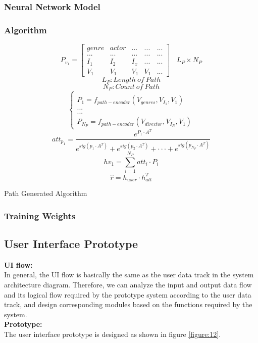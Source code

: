\subsubsection{Neural Network Model}
\subsubsection{Algorithm}

\begin{algorithm}[H]
\SetAlgoLined
\KwResult{ \[ P_{v_{1}} \] \[ \hat{r} \] }

\[
P_{v_{1}} = \begin{bmatrix}
 genre & actor  & ... & ... & ... \\ 
 ... & ...  & ... & ... & ... \\ 
 I_{1}& I_{2} & I_{x} & ... & ... \\ 
 V_{1} & V_{1}  & V_{1}  & V_{1} & ...
\end{bmatrix}
\ \ \ \ L_{P}\times N_{P}
\]
\[
L_{P} : Length \ of \ Path
\]
\[
N_{P} : Count \ of \ Path
\]
\[
\left\{\begin{matrix}
\\ P_{1} = f_{path-encoder} (V_{genres},V_{I_{1}},V_{1})
\\ ...
\\ ...
\\ P_{N_{P}} = f_{path-encoder} (V_{director},V_{I_{N}},V_{1})

\end{matrix}\right.
\]
\[
att_{p_{1}} = \frac{e^{P_{1} \cdot A^{T}}}{e^{sig(p_{1}\cdot A^{T})}  +  e^{sig(p_{2}\cdot A^{T})}  + \cdot \cdot \cdot +e^{sig(p_{N_{P}}\cdot A^{T})}}
\]
\[
hv_{1} =  \sum_{i=1}^{N_{P}} att_{i}\cdot P_{i}
\]
\[
\hat{r} = h_{user}\cdot h_{att}^{T}
\]
 
\caption{Path Generated Algorithm}
\end{algorithm}

\subsubsection{Training Weights}


\subsection{User Interface Prototype} 

\textbf{UI flow:}\\
In general, the UI flow is basically the same as the user data track in the system architecture diagram. Therefore, we can analyze the input and output data flow and its logical flow required by the prototype system according to the user data track, and design corresponding modules based on the functions required by the system.\\
\textbf{Prototype:}\\
The user interface prototype is designed as shown in figure \ref{figure:12}.

